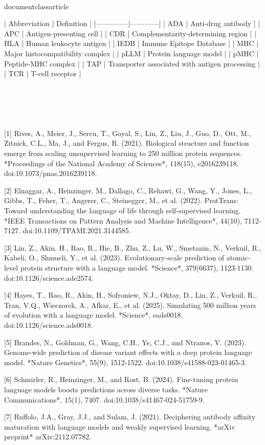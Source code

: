\\documentclass{article}
\begin{document}
| Abbreviation | Definition |
|--------------|------------|
| ADA | Anti-drug antibody |
| APC | Antigen-presenting cell |
| CDR | Complementarity-determining region |
| HLA | Human leukocyte antigen |
| IEDB | Immune Epitope Database |
| MHC | Major histocompatibility complex |
| pLLM | Protein language model |
| pMHC | Peptide-MHC complex |
| TAP | Transporter associated with antigen processing |
| TCR | T-cell receptor |

\section{}

[1] Rives, A., Meier, J., Sercu, T., Goyal, S., Lin, Z., Liu, J., Guo, D., Ott, M., Zitnick, C.L., Ma, J., and Fergus, R. (2021). Biological structure and function emerge from scaling unsupervised learning to 250 million protein sequences. *Proceedings of the National Academy of Sciences*, 118(15), e2016239118. doi:10.1073/pnas.2016239118.

[2] Elnaggar, A., Heinzinger, M., Dallago, C., Rehawi, G., Wang, Y., Jones, L., Gibbs, T., Feher, T., Angerer, C., Steinegger, M., et al. (2022). ProtTrans: Toward understanding the language of life through self-supervised learning. *IEEE Transactions on Pattern Analysis and Machine Intelligence*, 44(10), 7112-7127. doi:10.1109/TPAMI.2021.3144585.

[3] Lin, Z., Akin, H., Rao, R., Hie, B., Zhu, Z., Lu, W., Smetanin, N., Verkuil, R., Kabeli, O., Shmueli, Y., et al. (2023). Evolutionary-scale prediction of atomic-level protein structure with a language model. *Science*, 379(6637), 1123-1130. doi:10.1126/science.ade2574.

[4] Hayes, T., Rao, R., Akin, H., Sofroniew, N.J., Oktay, D., Lin, Z., Verkuil, R., Tran, V.Q., Wieczorek, A., Afkar, E., et al. (2025). Simulating 500 million years of evolution with a language model. *Science*, eads0018. doi:10.1126/science.ads0018.

[5] Brandes, N., Goldman, G., Wang, C.H., Ye, C.J., and Ntranos, V. (2023). Genome-wide prediction of disease variant effects with a deep protein language model. *Nature Genetics*, 55(9), 1512-1522. doi:10.1038/s41588-023-01465-3.

[6] Schmirler, R., Heinzinger, M., and Rost, B. (2024). Fine-tuning protein language models boosts predictions across diverse tasks. *Nature Communications*, 15(1), 7407. doi:10.1038/s41467-024-51759-9.

[7] Ruffolo, J.A., Gray, J.J., and Sulam, J. (2021). Deciphering antibody affinity maturation with language models and weakly supervised learning. *arXiv preprint* arXiv:2112.07782.
\end{document}

